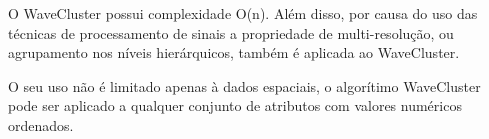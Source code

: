 O WaveCluster possui complexidade O(n). Além disso, por causa do uso das técnicas de processamento de sinais a propriedade de multi-resolução, ou agrupamento nos níveis hierárquicos, também é aplicada ao WaveCluster.

O seu uso não é limitado apenas à dados espaciais, o algorítimo WaveCluster pode ser aplicado a qualquer conjunto de atributos com valores numéricos ordenados.
	
%
%
%
